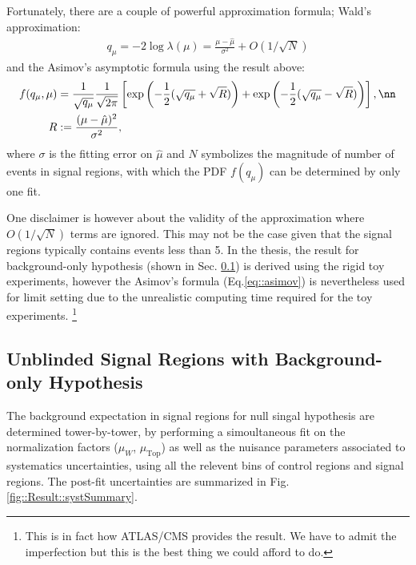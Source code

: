 Fortunately, there are a couple of powerful approximation formula; Wald's approximation:
\begin{align}
q_\mu = -2 \log\lambda(\mu) = \frac{\mu-\hat{\mu}}{\sigma^2} + O(1/\sqrt{N})
\end{align}
and the Asimov's asymptotic formula using the result above:
\begin{align}
f(q_\mu,\mu) & = \frac{1}{\sqrt{q_\mu}} \frac{1}{\sqrt{2\pi}} \left[ \exp \left( -\frac{1}{2}(\sqrt{q_\mu}+\sqrt{R}) \right) + \exp \left( -\frac{1}{2}(\sqrt{q_\mu}-\sqrt{R}) \right) \right], \nn \\
R & := \frac{(\mu-\hat{\mu})^2}{\sigma^2},
\label{eq::asimov}
\end{align}
where $\sigma$ is the fitting error on $\hat{\mu}$ and $N$ symbolizes the magnitude of number of events in signal regions, with which the PDF $f(q_\mu)$ can be determined by only one fit.

One disclaimer is however about the validity of the approximation where $O(1/\sqrt{N})$ terms are ignored.
This may not be the case given that the signal regions typically contains events less than 5.
In the thesis, the result for background-only hypothesis (shown in Sec. \ref{sed::Result::bgOnly}) is derived using the rigid toy experiments, however the Asimov's formula (Eq.\ref{eq::asimov}) is nevertheless used for limit setting due to the unrealistic computing time required for the toy experiments. 
\footnote{This is in fact how ATLAS/CMS provides the result. We have to admit the imperfection but this is the best thing we could afford to do.}


\clearpage
\subsection{Unblinded Signal Regions with Background-only Hypothesis} \label{sed::Result::bgOnly}
The background expectation in signal regions for null singal hypothesis are determined tower-by-tower, 
by performing a simoultaneous fit on the normalization factors ($\mu_W$, $\mu_{\mathrm{Top}}$) as well as the nuisance parameters associated to systematics uncertainties, 
using all the relevent bins of control regions and signal regions.
The post-fit uncertainties are summarized in Fig. \ref{fig::Result::systSummary}.  \\


